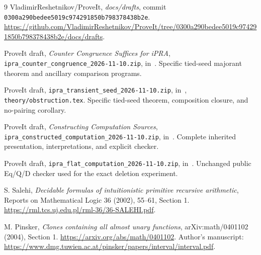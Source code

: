 \documentclass[11pt]{article}
\newcommand{\file}[1]{\texttt{\nolinkurl{#1}}}
\begin{document}
\begingroup\small\setlength{\parskip}{0pt}
\begin{thebibliography}{9}
\setlength{\itemsep}{0.35em}
 VladimirReshetnikov/ProveIt,
\emph{docs/drafts}, commit
\file{0300a290bedee5019c974291850b798378438b2e}.
\url{https://github.com/VladimirReshetnikov/ProveIt/tree/0300a290bedee5019c974291850b798378438b2e/docs/drafts}.

 ProveIt draft,
\emph{Counter Congruence Suffices for iPRA},
\file{ipra_counter_congruence_2026-11-10.zip}, in~\cite{snapshot}.
Specific tied-seed majorant theorem and ancillary comparison programs.

 ProveIt draft,
\file{ipra_transient_seed_2026-11-10.zip}, in~\cite{snapshot},
\file{theory/obstruction.tex}. Specific tied-seed theorem, composition
closure, and no-pairing corollary.

 ProveIt draft,
\emph{Constructing Computation Sources},
\file{ipra_constructed_computation_2026-11-10.zip}, in~\cite{snapshot}.
Complete inherited presentation, interpretations, and explicit checker.

 ProveIt draft,
\file{ipra_flat_computation_2026-11-10.zip}, in~\cite{snapshot}.
Unchanged public Eq/Q/D checker used for the exact deletion experiment.

 S. Salehi,
\emph{Decidable formulas of intuitionistic primitive recursive arithmetic},
Reports on Mathematical Logic 36 (2002), 55--61, Section 1.
\url{https://rml.tcs.uj.edu.pl/rml-36/36-SALEHI.pdf}.

 M. Pinsker,
\emph{Clones containing all almost unary functions},
arXiv:math/0401102 (2004), Section 1.
\url{https://arxiv.org/abs/math/0401102}.
Author's manuscript:
\url{https://www.dmg.tuwien.ac.at/pinsker/papers/interval/interval.pdf}.
\end{thebibliography}
\endgroup
\end{document}
